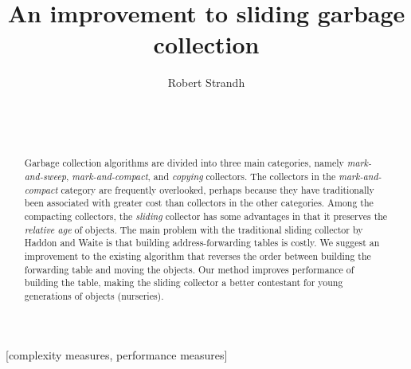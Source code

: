 \documentclass{acm_proc_article-sp}
\def\inputtex#1{}
\begin{document}
\title{An improvement to sliding garbage collection}
\author{\alignauthor
Robert Strandh\\
\\
\\
\\
}

\maketitle

\begin{abstract}
Garbage collection algorithms are divided into three main categories,
namely \emph{mark-and-sweep}, \emph{mark-and-compact}, and
\emph{copying} collectors.  The collectors in the
\emph{mark-and-compact} category are frequently overlooked, perhaps
because they have traditionally been associated with greater cost than
collectors in the other categories.  Among the compacting collectors,
the \emph{sliding} collector has some advantages in that it preserves
the \emph{relative age} of objects.  The main problem with the
traditional sliding collector by Haddon and Waite \cite{Haddon:1967}
is that building address-forwarding tables is costly.  We suggest an
improvement to the existing algorithm that reverses the order between
building the forwarding table and moving the objects.  Our method
improves performance of building the table, making the sliding
collector a better contestant for young generations of objects
(nurseries).
\end{abstract}

[complexity measures, performance measures]

\inputtex{sec-introduction.tex}
\inputtex{sec-previous.tex}
\inputtex{sec-our-method.tex}
\inputtex{sec-performance.tex}
\inputtex{sec-conclusions.tex}



\end{document}

